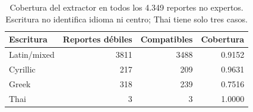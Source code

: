 \begin{table}[ht]
\centering\small
\caption{Cobertura del extractor en todos los 4.349 reportes no expertos. Escritura no identifica idioma ni centro; Thai tiene solo tres casos.}
\begin{tabular}{lrrr}
\toprule
Escritura & Reportes débiles & Compatibles & Cobertura \\
\midrule
Latin/mixed & 3811 & 3488 & 0.9152 \\
Cyrillic & 217 & 209 & 0.9631 \\
Greek & 318 & 239 & 0.7516 \\
Thai & 3 & 3 & 1.0000 \\
\bottomrule
\end{tabular}
\end{table}
